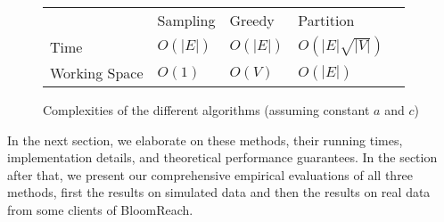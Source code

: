 \begin{figure}[H]
\centering
\begin{tabular}{l|l|l|l|l}
\cline{2-4}
                                    & Sampling                                        & Greedy   & Partition          &  \\ \cline{1-4}
\multicolumn{1}{|l|}{Time}          & $O(|E|)$                                        & $O(|E|)$ & $O(|E|\sqrt{|V|})$ &  \\ \cline{1-4}
\multicolumn{1}{|l|}{Working Space} & $O(1)$                                          & $O(V)$   & $O(|E|)$           &  \\ \cline{1-4}
\end{tabular}
\caption{Complexities of the different algorithms (assuming constant $a$ and $c$)}
\end{figure}

In the next section, we elaborate on these methods, their running
times, implementation details, and theoretical performance
guarantees. In the section after that, we present our comprehensive
empirical evaluations of all three methods, first the results on
simulated data and then the results on real data from some clients of
BloomReach. 